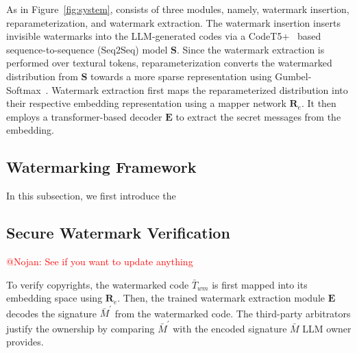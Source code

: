 As in Figure~\ref{fig:system}, \sys{} consists of three modules, namely, watermark insertion, reparameterization, and watermark extraction. The watermark insertion inserts invisible watermarks into the LLM-generated codes via a CodeT5+~\cite{wang2023codet5plus} based sequence-to-sequence (Seq2Seq) model $\mathbf{S}$. Since the watermark extraction is performed over textural tokens, reparameterization converts the watermarked distribution from $\mathbf{S}$ towards a more sparse representation using Gumbel-Softmax~\cite{jang2016categorical}. Watermark extraction first maps the reparameterized distribution into their respective embedding representation using a mapper network $\mathbf{R}_e$. It then employs a transformer-based decoder $\mathbf{E}$ to extract the secret messages from the embedding.

\subsection{Watermarking Framework}
In this subsection, we first introduce the 

\paragraph{}

\subsection{Secure Watermark Verification}

\textcolor{red}{@Nojan: See if you want to update anything}


To verify copyrights, the watermarked code  $\bar{T}_{wm}$ is first mapped into its embedding space using $\mathbf{R}_e$. Then, the trained watermark extraction module $\mathbf{E}$ decodes the signature $\bar{M}^\prime$ from the watermarked code. The third-party arbitrators justify the ownership by comparing $\bar{M}^\prime$ with the encoded signature $\bar{M}$ LLM  owner provides. 


